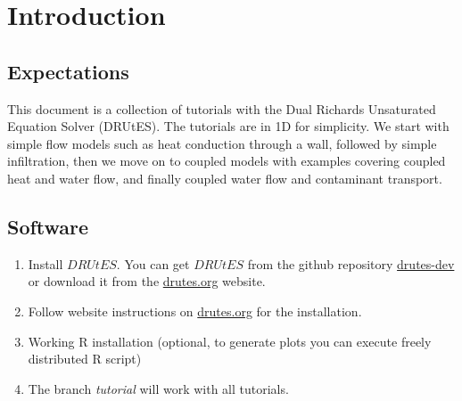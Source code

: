 \chapter{Introduction}

\section{Expectations}

This document is a collection of tutorials with the Dual Richards Unsaturated Equation Solver (DRUtES). The tutorials are in 1D for simplicity. We start with simple flow models such as heat conduction through a wall, followed by simple infiltration, then we move on to coupled models with examples covering coupled heat and water flow, and finally coupled water flow and contaminant transport.

\section{Software}

\begin{enumerate}
	\item Install $DRUtES$. You can get $DRUtES$ from the github repository \href{https://github.com/michalkuraz/drutes-dev/} {drutes-dev} or download it from the \href{http://drutes.org/public/?core=account}{drutes.org} website. 
	\item Follow website instructions on \href{http://drutes.org/public/?core=account}{drutes.org} for the installation.
	\item Working R installation (optional, to generate plots you can execute freely distributed R script) 
	\item The branch \textit{tutorial} will work with all tutorials.  
\end{enumerate}